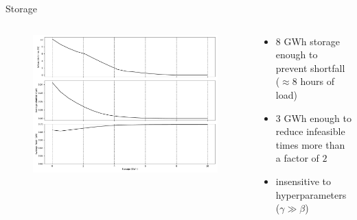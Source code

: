 \documentclass[aspectratio=169,11pt]{beamer}
\begin{document}
\begin{frame}{Storage}
\begin{columns}
    \begin{column}{0.6\textwidth}
        \begin{figure}
            \centering
            \includegraphics[width=\columnwidth]{./figures/storage.pdf}
        \end{figure}
    \end{column}
    \begin{column}{0.4\textwidth}
        \begin{itemize}
            \item $8$ GWh storage enough to prevent shortfall ($\approx 8$ hours of load)
            \item $3$ GWh enough to reduce infeasible times more than a factor of $2$
            \item insensitive to hyperparameters ($\gamma \gg \beta$)
        \end{itemize}
    \end{column}
\end{columns}
\end{frame}
\end{document}
